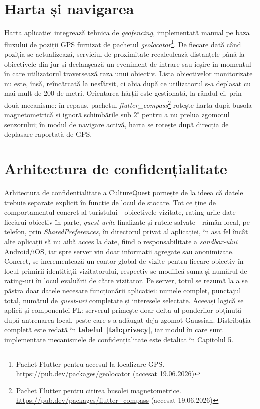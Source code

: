 \documentclass[12pt,a4paper]{report}
\begin{document}
\section{Harta și navigarea}

Harta aplicației integrează tehnica de \textit{geofencing}, implementată manual pe baza fluxului de poziții GPS furnizat de pachetul \textit{geolocator}\footnote{Pachet Flutter pentru accesul la localizare GPS. \url{https://pub.dev/packages/geolocator} (accesat 19.06.2026)}. De fiecare dată când poziția se actualizează, serviciul de proximitate recalculează distanțele până la obiectivele din jur și declanșează un eveniment de intrare sau ieșire în momentul în care utilizatorul traversează raza unui obiectiv. Lista obiectivelor monitorizate nu este, însă, reîncărcată la nesfârșit, ci abia după ce utilizatorul s-a deplasat cu mai mult de 200 de metri. Orientarea hărții este gestionată, la rândul ei, prin două mecanisme: în repaus, pachetul \textit{flutter\_compass}\footnote{Pachet Flutter pentru citirea busolei magnetometrice. \url{https://pub.dev/packages/flutter_compass} (accesat 19.06.2026)} rotește harta după busola magnetometrică și ignoră schimbările sub $2^\circ$ pentru a nu prelua zgomotul senzorului; în modul de navigare activă, harta se rotește după direcția de deplasare raportată de GPS.

\section{Arhitectura de confidențialitate}

Arhitectura de confidențialitate a CultureQuest pornește de la ideea că datele trebuie separate explicit în funcție de locul de stocare. Tot ce ține de comportamentul concret al turistului - obiectivele vizitate, rating-urile date fiecărui obiectiv în parte, \textit{quest-urile} finalizate și rutele salvate - rămân local, pe telefon, prin \textit{SharedPreferences}, în directorul privat al aplicației, în așa fel încât alte aplicații să nu aibă acces la date, fiind o responsabilitate a \textit{sandbox-ului} Android/iOS, iar spre server vin doar informații agregate sau anonimizate. Concret, se incrementează un contor global de vizite pentru fiecare obiectiv în locul primirii identității vizitatorului, respectiv se modifică suma și numărul de rating-uri în locul evaluării de către vizitator. Pe server, totul se rezumă la a se păstra doar datele necesare funcționării aplicației: numele complet, punctajul total, numărul de \textit{quest-uri} completate și interesele selectate. Aceeași logică se aplică și componentei FL: serverul primește doar delta-ul ponderilor obținută după antrenarea local, peste care s-a adăugat deja zgomot Gaussian. Distribuția completă este redată în \textbf{tabelul~\ref{tab:privacy}}, iar modul în care sunt implementate mecanismele de confidențialitate este detaliat în Capitolul 5.
\end{document}
